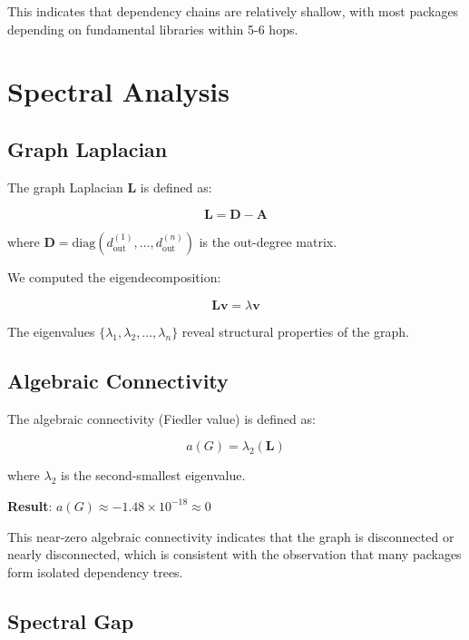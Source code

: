 \documentclass[11pt,a4paper]{article}
\begin{document}
This indicates that dependency chains are relatively shallow, with most packages depending on fundamental libraries within 5-6 hops.

\section{Spectral Analysis}

\subsection{Graph Laplacian}

The graph Laplacian $\mathbf{L}$ is defined as:

\begin{equation}
\mathbf{L} = \mathbf{D} - \mathbf{A}
\end{equation}

where $\mathbf{D} = \text{diag}(d_{\text{out}}^{(1)}, \ldots, d_{\text{out}}^{(n)})$ is the out-degree matrix.

We computed the eigendecomposition:

\begin{equation}
\mathbf{L}\mathbf{v} = \lambda\mathbf{v}
\end{equation}

The eigenvalues $\{\lambda_1, \lambda_2, \ldots, \lambda_n\}$ reveal structural properties of the graph.

\subsection{Algebraic Connectivity}

The algebraic connectivity (Fiedler value) is defined as:

\begin{equation}
a(G) = \lambda_2(\mathbf{L})
\end{equation}

where $\lambda_2$ is the second-smallest eigenvalue.

\textbf{Result}: $a(G) \approx -1.48 \times 10^{-18} \approx 0$

This near-zero algebraic connectivity indicates that the graph is disconnected or nearly disconnected, which is consistent with the observation that many packages form isolated dependency trees.

\subsection{Spectral Gap}
\end{document}
